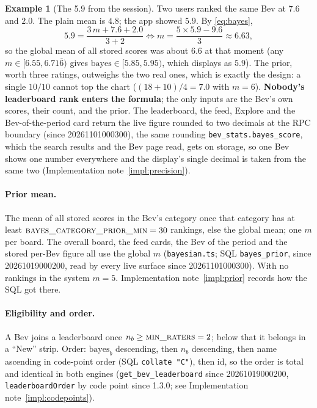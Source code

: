 \documentclass[11pt]{article}
\newcommand{\code}[1]{\texttt{#1}}
\theoremstyle{plain}
\theoremstyle{definition}
\newtheorem{example}[theorem]{Example}
\theoremstyle{remark}
\begin{document}
\begin{example}[The 5.9 from the session]\label{ex:59}
Two users ranked the same Bev at $7.6$ and $2.0$. The plain mean is $4.8$; the app showed $5.9$. By \eqref{eq:bayes},
\[
5.9 = \frac{3\,m + 7.6 + 2.0}{3 + 2} \iff m = \frac{5 \times 5.9 - 9.6}{3} \approx 6.63,
\]
so the global mean of all stored scores was about $6.6$ at that moment (any $m \in [6.55, 6.71\overline{6})$ gives $\mathrm{bayes} \in [5.85, 5.95)$, which displays as $5.9$). The prior, worth three ratings, outweighs the two real ones, which is exactly the design: a single $10/10$ cannot top the chart ($(18 + 10)/4 = 7.0$ with $m = 6$). \textbf{Nobody's leaderboard rank enters the formula}; the only inputs are the Bev's own scores, their count, and the prior. The leaderboard, the feed, Explore and the Bev-of-the-period card return the live figure rounded to two decimals at the RPC boundary (since 20261101000300), the same rounding \code{bev\_stats.bayes\_score}, which the search results and the Bev page read, gets on storage, so one Bev shows one number everywhere and the display's single decimal is taken from the same two (Implementation note~\ref{impl:precision}).
\end{example}

\paragraph{Prior mean.} The mean of all stored scores in the Bev's category once that category has at least $\textsc{bayes\_category\_prior\_min} = 30$ rankings, else the global mean; one $m$ per board. The overall board, the feed cards, the Bev of the period and the stored per-Bev figure all use the global $m$ (\code{bayesian.ts}; SQL \code{bayes\_prior}, since 20261019000200, read by every live surface since 20261101000300). With no rankings in the system $m = 5$. Implementation note~\ref{impl:prior} records how the SQL got there.

\paragraph{Eligibility and order.} A Bev joins a leaderboard once $n_b \ge \textsc{min\_raters} = 2$; below that it belongs in a ``New'' strip. Order: $\mathrm{bayes}_b$ descending, then $n_b$ descending, then name ascending in code-point order (SQL \code{collate "C"}), then id, so the order is total and identical in both engines (\code{get\_bev\_leaderboard} since 20261019000200, \code{leaderboardOrder} by code point since 1.3.0; see Implementation note~\ref{impl:codepoints}).
\end{document}
